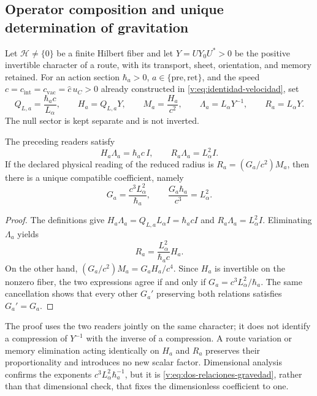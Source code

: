 \subsection{Operator composition and unique determination of gravitation}

Let $\mathcal H\ne\{0\}$ be a finite Hilbert fiber and let $Y=UY_0U^*>0$
be the positive invertible character of a route, with its transport, sheet,
orientation, and memory retained. For an action section
$\hbar_a>0$, $a\in\{\mathrm{pre},\mathrm{ret}\}$, and the speed
$c=c_{\mathrm{int}}=c_{\mathrm{vac}}=\widehat c\,u_C>0$ already constructed in
\eqref{v:eq:identidad-velocidad}, set
\begin{equation}
 Q_{L,a}=\frac{\hbar_ac}{L_\alpha},\qquad
 H_a=Q_{L,a}Y,\qquad M_a=\frac{H_a}{c^2},\qquad
 \Lambda_a=L_\alpha Y^{-1},\qquad R_a=L_\alpha Y.
 \label{v:eq:lectores-longitud-accion}
\end{equation}
The null sector is kept separate and is not inverted.

\begin{theorem}
\label{v:thm:gravedad-unica-alpha}
The preceding readers satisfy
\begin{equation}
 H_a\Lambda_a=\hbar_ac\,I,\qquad
 R_a\Lambda_a=L_\alpha^2I.
 \label{v:eq:dos-relaciones-gravedad}
\end{equation}
If the declared physical reading of the reduced radius is
$R_a=(G_a/c^2)M_a$, then there is a unique compatible coefficient, namely
\begin{equation}
 \boxed{G_a=\frac{c^3L_\alpha^2}{\hbar_a}},
 \qquad
 \boxed{\frac{G_a\hbar_a}{c^3}=L_\alpha^2}.
 \label{v:eq:gravedad-unica-alpha}
\end{equation}
\end{theorem}
\begin{proof}
The definitions give
$H_a\Lambda_a=Q_{L,a}L_\alpha I=\hbar_acI$ and
$R_a\Lambda_a=L_\alpha^2I$. Eliminating $\Lambda_a$ yields
\[
 R_a=\frac{L_\alpha^2}{\hbar_ac}H_a.
\]
On the other hand,
$(G_a/c^2)M_a=G_aH_a/c^4$. Since $H_a$ is invertible on the nonzero
fiber, the two expressions agree if and only if
$G_a=c^3L_\alpha^2/\hbar_a$. The same cancellation shows that every
other $G_a'$ preserving both relations satisfies $G_a'=G_a$.
\end{proof}

The proof uses the two readers jointly on the same character; it does not
identify a compression of $Y^{-1}$ with the inverse of a compression. A
route variation or memory elimination acting identically on $H_a$ and
$R_a$ preserves their proportionality and introduces no new scalar factor.
Dimensional analysis confirms the exponents
$c^3L_\alpha^2\hbar_a^{-1}$, but it is
\eqref{v:eq:dos-relaciones-gravedad}, rather than that dimensional check,
that fixes the dimensionless coefficient to one.

